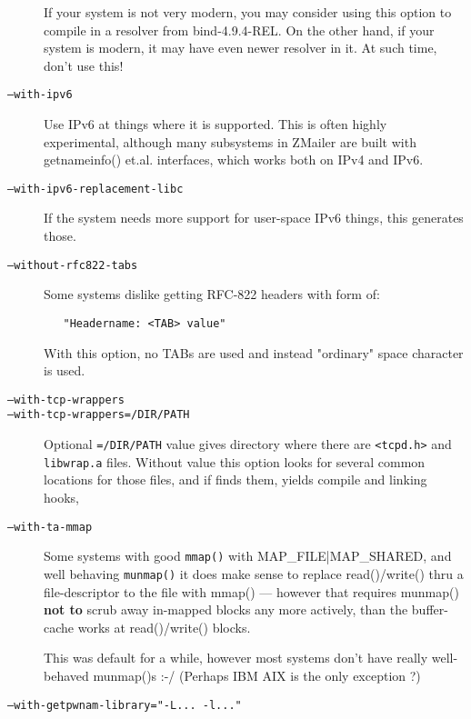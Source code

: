 \begin{description}
If your system is not very modern, you may consider using
this option to compile in a resolver from bind-4.9.4-REL.
On the other hand, if your system is modern, it may have
even newer resolver in it.  At such time, don't use this!

\item[\tt ---with-ipv6] \mbox{}

Use IPv6 at things where it is supported.  This is often
highly experimental, although many subsystems in ZMailer
are built with   getnameinfo()  et.al. interfaces, which
works both on IPv4 and IPv6.

\item[\tt ---with-ipv6-replacement-libc] \mbox{}

If the system needs more support for user-space IPv6
things, this generates those.

\item[\tt ---without-rfc822-tabs] \mbox{}

Some systems dislike getting RFC-822 headers with form of:
\begin{verbatim}
   "Headername: <TAB> value"
\end{verbatim}
With this option, no TABs are used and instead "ordinary"
space character is used.

\item[\tt ---with-tcp-wrappers] \mbox{}
\item[\tt ---with-tcp-wrappers=/DIR/PATH] \mbox{}

Optional  {\tt =/DIR/PATH}  value gives directory where there are
{\tt <tcpd.h>}  and  {\tt libwrap.a}  files.
Without value this option looks for several common locations
for those files, and if finds them, yields compile and linking
hooks,

\item[\tt ---with-ta-mmap] \mbox{}

Some systems with good {\tt mmap()} with MAP\_FILE|MAP\_SHARED,
and well behaving  {\tt munmap()}  it does make sense to replace
read()/write() thru a file-descriptor to the file with
mmap() --- however that requires munmap() {\bf not to} scrub
away in-mapped blocks any more actively, than the buffer-cache
works at read()/write() blocks.

This was default for a while, however most systems don't
have really well-behaved munmap()s :-/
(Perhaps IBM AIX is the only exception ?)

\item[\tt ---with-getpwnam-library="-L... -l..."] \mbox{}


\end{description}
